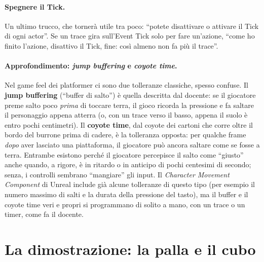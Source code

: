 \paragraph{Spegnere il Tick.} Un ultimo trucco, che tornerà utile tra poco: ``potete
disattivare o attivare il Tick di ogni actor''. Se un trace gira sull'Event Tick solo per
fare un'azione, ``come ho finito l'azione, disattivo il Tick, fine: così almeno non fa
più il trace''.

\paragraph{Approfondimento: \emph{jump buffering} e \emph{coyote time}.} Nel game feel
dei platformer ci sono due tolleranze classiche, spesso confuse. Il \textbf{jump
buffering} (``buffer di salto'') è quella descritta dal docente: se il giocatore preme
salto poco \emph{prima} di toccare terra, il gioco ricorda la pressione e fa saltare il
personaggio appena atterra (o, con un trace verso il basso, appena il suolo è entro pochi
centimetri). Il \textbf{coyote time}, dal coyote dei cartoni che corre oltre il bordo
del burrone prima di cadere, è la tolleranza opposta: per qualche frame \emph{dopo} aver
lasciato una piattaforma, il giocatore può ancora saltare come se fosse a terra.
Entrambe esistono perché il giocatore percepisce il salto come ``giusto'' anche quando,
a rigore, è in ritardo o in anticipo di pochi centesimi di secondo; senza, i controlli
sembrano ``mangiare'' gli input. Il \emph{Character Movement Component} di Unreal
include già alcune tolleranze di questo tipo (per esempio il numero massimo di salti e
la durata della pressione del tasto), ma il buffer e il coyote time veri e propri si
programmano di solito a mano, con un trace o un timer, come fa il docente.

\section{La dimostrazione: la palla e il cubo}
\label{ue6:sec:demo}

